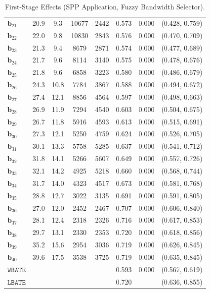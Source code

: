 \documentclass[10pt]{article}
\newcommand{\bb}{\mathbf{b}}
\begin{document}
\begin{table}[p]
\begin{tabular}{lccccccc}
   $\bb_{21}$ & 20.9 & 9.3 & 10677 & 2442 & 0.573 & 0.000 & (0.428, 0.759)\\
   $\bb_{22}$ & 22.0 & 9.8 & 10830 & 2843 & 0.576 & 0.000 & (0.470, 0.709)\\
   $\bb_{23}$ & 21.3 & 9.4 & 8679 & 2871 & 0.574 & 0.000 & (0.477, 0.689)\\
   $\bb_{24}$ & 21.7 & 9.6 & 8114 & 3140 & 0.575 & 0.000 & (0.478, 0.676)\\
   $\bb_{25}$ & 21.8 & 9.6 & 6858 & 3223 & 0.580 & 0.000 & (0.486, 0.679)\\
   $\bb_{26}$ & 24.3 & 10.8 & 7784 & 3867 & 0.588 & 0.000 & (0.494, 0.672)\\
   $\bb_{27}$ & 27.4 & 12.1 & 8856 & 4564 & 0.597 & 0.000 & (0.498, 0.663)\\
   $\bb_{28}$ & 26.9 & 11.9 & 7294 & 4540 & 0.603 & 0.000 & (0.504, 0.675)\\
   $\bb_{29}$ & 26.7 & 11.8 & 5916 & 4593 & 0.613 & 0.000 & (0.515, 0.691)\\
   $\bb_{30}$ & 27.3 & 12.1 & 5250 & 4759 & 0.624 & 0.000 & (0.526, 0.705)\\
   $\bb_{31}$ & 30.1 & 13.3 & 5758 & 5285 & 0.637 & 0.000 & (0.541, 0.712)\\
   $\bb_{32}$ & 31.8 & 14.1 & 5266 & 5607 & 0.649 & 0.000 & (0.557, 0.726)\\
   $\bb_{33}$ & 32.1 & 14.2 & 4925 & 5218 & 0.660 & 0.000 & (0.568, 0.744)\\
   $\bb_{34}$ & 31.7 & 14.0 & 4323 & 4517 & 0.673 & 0.000 & (0.581, 0.768)\\
   $\bb_{35}$ & 28.8 & 12.7 & 3022 & 3135 & 0.691 & 0.000 & (0.591, 0.805)\\
   $\bb_{36}$ & 27.0 & 12.0 & 2452 & 2467 & 0.707 & 0.000 & (0.606, 0.840)\\
   $\bb_{37}$ & 28.1 & 12.4 & 2318 & 2326 & 0.716 & 0.000 & (0.617, 0.853)\\
   $\bb_{38}$ & 29.7 & 13.1 & 2330 & 2353 & 0.720 & 0.000 & (0.618, 0.856)\\
   $\bb_{39}$ & 35.2 & 15.6 & 2954 & 3036 & 0.719 & 0.000 & (0.626, 0.845)\\
   $\bb_{40}$ & 39.6 & 17.5 & 3538 & 3725 & 0.719 & 0.000 & (0.635, 0.845)\\
  \midrule
   $\mathtt{WBATE}$ &  &  &  &  & 0.593 & 0.000 & (0.567, 0.619)\\
  \midrule
   $\mathtt{LBATE}$ &  &  &  &  & 0.720 &  & (0.636, 0.855)\\
  \bottomrule\bottomrule
\end{tabular}

    \caption{First-Stage Effects (SPP Application, Fuzzy Bandwidth Selector).}
    \label{tab:sa-empapp_main_fs_bwmain}
\end{table}
\end{document}

